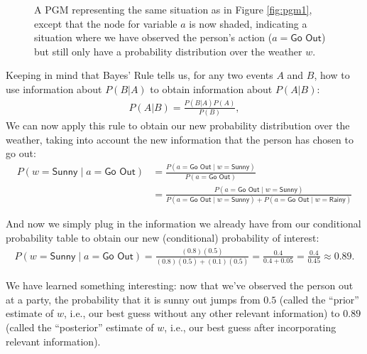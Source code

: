 \begin{subappendices}
\begin{figure}[ht!]
  \centering
  \caption{A PGM representing the same situation as in Figure \ref{fig:pgm1}, except that the node for variable $a$ is now shaded, indicating a situation where we have observed the person's action ($a = \textsf{Go Out}$) but still only have a probability distribution over the weather $w$.}
  \label{fig:pgm2}
\end{figure}


Keeping in mind that Bayes' Rule tells us, for any two events $A$ and $B$, how to use information about $P(B|A)$ to obtain information about $P(A|B)$:
\begin{align*}
P(A | B) = \frac{P(B | A)P(A)}{P(B)},
\end{align*}
We can now apply this rule to obtain our new probability distribution over the weather, taking into account the new information that the person has chosen to go out:
\begin{align*}
P(w = \textsf{Sunny} \; | \; a = \textsf{Go Out}) &= \frac{P(a = \textsf{Go Out} \; | \; w = \textsf{Sunny})}{P(a = \textsf{Go Out})} \\
&= \frac{P(a = \textsf{Go Out} \; | \; w = \textsf{Sunny})}{P(a = \textsf{Go Out} \; | \; w = \textsf{Sunny}) + P(a = \textsf{Go Out} \; | \; w = \textsf{Rainy})}
\end{align*}

And now we simply plug in the information we already have from our conditional probability table to obtain our new (conditional) probability of interest:
\begin{align*}
P(w = \textsf{Sunny} \; | \; a = \textsf{Go Out}) = \frac{(0.8)(0.5)}{(0.8)(0.5) + (0.1)(0.5)} = \frac{0.4}{0.4 + 0.05} = \frac{0.4}{0.45} \approx 0.89.
\end{align*}

We have learned something interesting: now that we've observed the person out at a party, the probability that it is sunny out jumps from $0.5$ (called the ``prior'' estimate of $w$, i.e., our best guess without any other relevant information) to $0.89$ (called the ``posterior'' estimate of $w$, i.e., our best guess after incorporating relevant information).

\end{subappendices}
